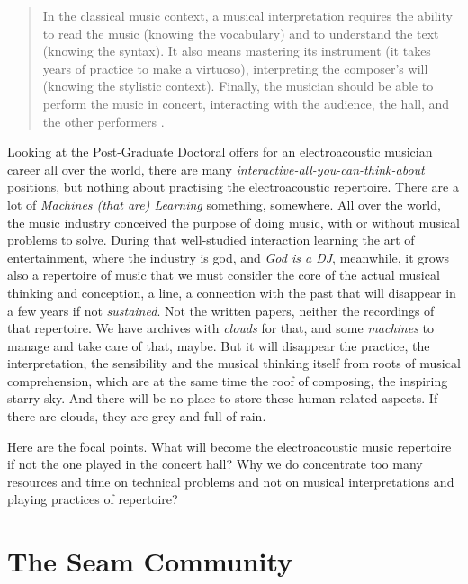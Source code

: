 \documentclass[twoside,a4paper]{article}
\begin{document}
\begin{quote}
In the classical music context, a musical interpretation requires the ability to
read the music (knowing the vocabulary) and to understand the text (knowing the
syntax). It also means mastering its instrument (it takes years of practice to
make a virtuoso), interpreting the composer's will (knowing the stylistic context).
Finally, the musician should be able to perform the music in concert, interacting
with the audience, the hall, and the other performers \cite{lem16}.
\end{quote}

Looking at the Post-Graduate Doctoral offers for an electroacoustic musician
career all over the world, there are many \emph{interactive-all-you-can-think-about}
positions, but nothing about practising the electroacoustic repertoire. There are
a lot of \emph{Machines (that are) Learning} something, somewhere. All over the
world, the music industry conceived the purpose of doing music, with or without
musical problems to solve. During that well-studied interaction learning the art
of entertainment, where the industry is god, and \emph{God is a DJ}, meanwhile,
it grows also a repertoire of music that we must consider the core of the actual
musical thinking and conception, a line, a connection with the past that will
disappear in a few years if not \emph{sustained}. Not the written papers, neither
the recordings of that repertoire. We have archives with \emph{clouds} for that,
and some \emph{machines} to manage and take care of that, maybe. But it will
disappear the practice, the interpretation, the sensibility and the musical
thinking itself from roots of musical comprehension, which are at the same time
the roof of composing, the inspiring starry sky. And there will be no place to
store these human-related aspects. If there are clouds, they are grey and full
of rain.

Here are the focal points. What will become the electroacoustic music repertoire
if not the one played in the concert hall? Why we do concentrate too many
resources and time on technical problems and not on musical interpretations and
playing practices of repertoire?


\section{The Seam Community}
\label{sec:seam}
\end{document}
